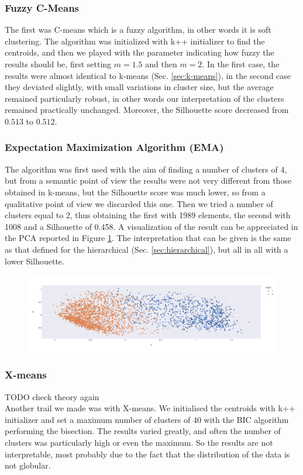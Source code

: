\subsubsection{Fuzzy C-Means}
The first was C-means which is a fuzzy algorithm, in other words it is soft clustering. The algorithm was initialized with k++ initializer to find the centroids, and then we played with the parameter indicating how fuzzy the results should be, first setting $m=1.5$ and then $m=2$. In the first case, the results were almost identical to k-means (Sec. \ref{sec:k-means}), in the second case they deviated slightly, with small variations in cluster size, but the average remained particularly robust, in other words our interpretation of the clusters remained practically unchanged. Moreover, the Silhouette score decreased from $0.513$ to $0.512$.

\subsubsection{Expectation Maximization Algorithm (EMA)}
The algorithm was first used with the aim of finding a number of clusters of 4, but from a semantic point of view the results were not very different from those obtained in k-means, but the Silhouette score was much lower, so from a qualitative point of view we discarded this one. Then we tried a number of clusters equal to 2, thus obtaining the first with 1989 elements, the second with 1008 and a Silhouette of 0.458. A visualization of the result can be appreciated in the PCA reported in Figure \ref{fig:ema_pca}. The interpretation that can be given is the same as that defined for the hierarchical (Sec. \ref{sec:hierarchical}), but all in all with a lower Silhouette.
\begin{figure}[h]
	\centering
	\includegraphics[width=\textwidth]{plots/ema/ema_pca.png}
	\label{fig:ema_pca}
\end{figure}

\subsubsection{X-means}
TODO check theory again\\
Another trail we made was with X-means. We initialised the centroids with k++ initializer and set a maximum number of clusters of $40$ with the BIC algorithm performing the bisection. The results varied greatly, and often the number of clusters was particularly high or even the maximum. So the results are not interpretable, most probably due to the fact that the distribution of the data is not globular.